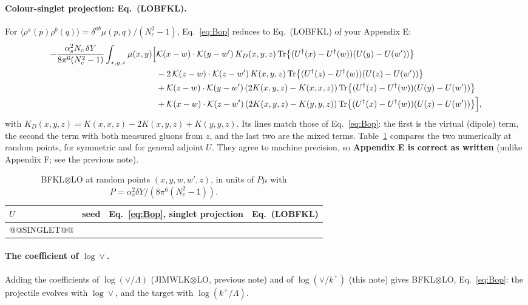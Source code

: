 \documentclass[10pt]{article}
\numberwithin{equation}{section}
\newcommand{\KK}{\mathcal K}
\newcommand{\Ud}{U^{\dagger}}
\newcommand{\Tr}{{\rm Tr}}
\begin{document}
\paragraph{Colour-singlet projection: Eq.~(LOBFKL).} For $\langle\rho^a(p)\rho^b(q)\rangle=\delta^{ab}\mu(p,q)/(N_c^2-1)$, Eq.~\eqref{eq:Bop} reduces to Eq.~(LOBFKL) of your Appendix E:
\begin{align}
-\frac{\alpha_s^2N_c\,\delta Y}{8\pi^6(N_c^2-1)}\int_{x,y,z}\mu(x,y)\Big[&\KK(x-w)\cdot\KK(y-w')\,K_D(x,y,z)\,\Tr\big\{(\Ud(x)-\Ud(w))(U(y)-U(w'))\big\}\notag\\
&-2\,\KK(z-w)\cdot\KK(z-w')\,K(x,y,z)\,\Tr\big\{(\Ud(z)-\Ud(w))(U(z)-U(w'))\big\}\notag\\
&+\KK(z-w)\cdot\KK(y-w')\,(2K(x,y,z)-K(x,x,z))\,\Tr\big\{(\Ud(z)-\Ud(w))(U(y)-U(w'))\big\}\notag\\
&+\KK(x-w)\cdot\KK(z-w')\,(2K(x,y,z)-K(y,y,z))\,\Tr\big\{(\Ud(x)-\Ud(w))(U(z)-U(w'))\big\}\Big],
\end{align}
with $K_D(x,y,z)=K(x,x,z)-2K(x,y,z)+K(y,y,z)$. Its lines match those of Eq.~\eqref{eq:Bop}: the first is the virtual (dipole) term, the second the term with both measured gluons from $z$, and the last two are the mixed terms. Table~\ref{tab:singlet} compares the two numerically at random points, for symmetric and for general adjoint $U$. They agree to machine precision, so \textbf{Appendix E is correct as written} (unlike Appendix F; see the previous note).

\begin{table}[H]
\centering\small
\begin{tabular}{@{}l c c c@{}}
$U$ & seed & Eq.~\eqref{eq:Bop}, singlet projection & Eq.~(LOBFKL) \\ \hline
@@SINGLET@@
\end{tabular}
\caption{BFKL$\otimes$LO at random points $(x,y,w,w',z)$, in units of $P\mu$ with $P=\alpha_s^2\delta Y/(8\pi^6(N_c^2-1))$.}\label{tab:singlet}
\end{table}

\paragraph{The coefficient of $\log\vee$.} Adding the coefficients of $\log(\vee/\Lambda)$ (JIMWLK$\otimes$LO, previous note) and of $\log(\vee/k^+)$ (this note) gives BFKL$\otimes$LO, Eq.~\eqref{eq:Bop}: the projectile evolves with $\log\vee$, and the target with $\log(k^+/\Lambda)$.

\end{document}
